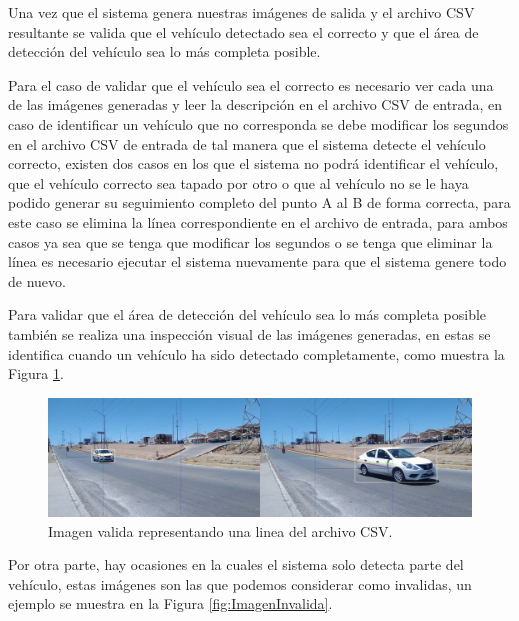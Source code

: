 
Una vez que el sistema genera nuestras imágenes de salida y el archivo CSV resultante se valida que el vehículo detectado sea el correcto y que el área de detección del vehículo sea lo más completa posible.

Para el caso de validar que el vehículo sea el correcto es necesario ver cada una de las imágenes generadas y leer la descripción en el archivo CSV de entrada, en caso de identificar un vehículo que no corresponda se debe modificar los segundos en el archivo CSV de entrada de tal manera que el sistema detecte el vehículo  correcto, existen dos casos en los que el sistema no podrá identificar el vehículo, que el vehículo correcto sea tapado por otro o que al vehículo no se le haya podido generar su seguimiento completo del punto A al B de forma correcta, para este caso se elimina la línea correspondiente en el archivo de entrada, para ambos casos ya sea que se tenga que modificar los segundos o se tenga que eliminar la línea es necesario ejecutar el sistema nuevamente para que el sistema genere todo de nuevo.

Para validar que el área de detección del vehículo sea lo más completa posible también se realiza una inspección visual de las imágenes generadas, en estas se identifica cuando un vehículo ha sido detectado completamente, como muestra la Figura \ref{fig:ImagenValida}.

\begin{figure}[H]
    \centering
    \includegraphics[width=1\textwidth]{Metodologia/imgs/Valido.jpg}
    \caption{Imagen valida representando una linea del archivo CSV.}
    \label{fig:ImagenValida}
\end{figure}

Por otra parte, hay ocasiones en la cuales el sistema solo detecta parte del vehículo, estas imágenes son las que podemos considerar como invalidas, un ejemplo se muestra en la Figura \ref{fig:ImagenInvalida}.

